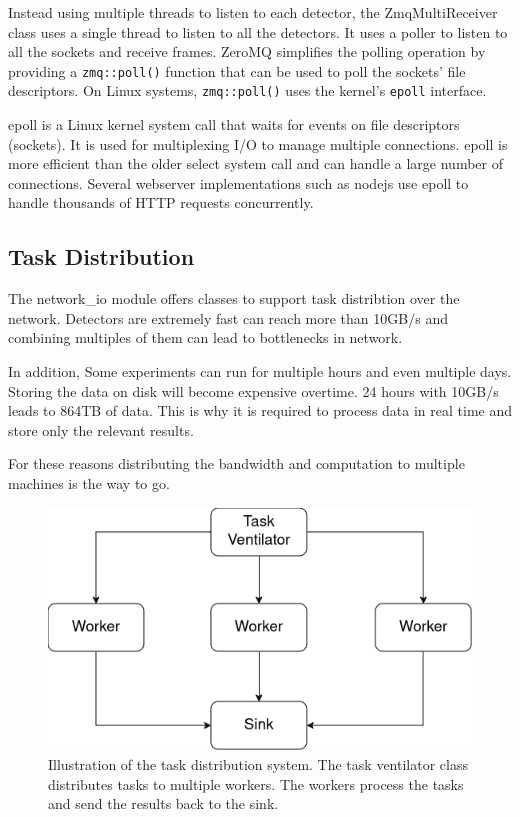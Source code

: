 \begin{spacing}{1.2}
    Instead using multiple threads to listen to each detector, the ZmqMultiReceiver class uses a single
    thread to listen to all the detectors. It uses a poller to listen to all the sockets and receive
    frames. ZeroMQ simplifies the polling operation by providing a \lstinline|zmq::poll()|
    function that can be used to poll the sockets' file descriptors. On Linux systems,
    \lstinline|zmq::poll()| uses the kernel's \lstinline|epoll| interface.

    epoll is a Linux kernel system call that waits for events on file descriptors (sockets). It is used for
    multiplexing I/O to manage multiple connections. epoll is more efficient than the older select system call
    and can handle a large number of connections. Several webserver implementations such as nodejs use epoll to handle
    thousands of HTTP requests concurrently. \cite{gammo2004comparing, marathe2015introduction}\\

    \subsection{Task Distribution}
    The network\_io module offers classes to support task distribtion over the network.
    Detectors are extremely fast can reach more than 10GB/s and combining multiples of them
    can lead to bottlenecks in network.

    In addition, Some experiments
    can run for multiple hours and even multiple days. Storing the data on disk will become expensive
    overtime. 24 hours with 10GB/s leads to 864TB of data. This is why it is required to
    process data in real time and store only the relevant results.

    For these reasons distributing the bandwidth and computation to multiple machines
    is the way to go.\\

    \begin{figure}
        \centering
        \includegraphics[width=\textwidth]{Chapitre3/figures/task_distribution.png}
        \caption{Illustration of the task distribution system. The task ventilator class distributes
            tasks to multiple workers. The workers process the tasks and send the results back to the
            sink.}
        \label{fig:task_distribution}
    \end{figure}


\end{spacing}
